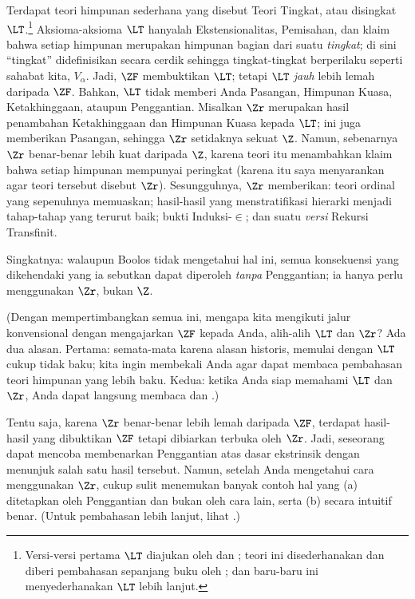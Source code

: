 \documentclass[../../../include/open-logic-section]{subfiles}
\begin{document}
Terdapat teori himpunan sederhana yang disebut Teori Tingkat, atau disingkat
$\LT$.\footnote{Versi-versi pertama $\LT$ diajukan oleh
\citet{Montague1965} dan \citet{Scott1974}; teori ini disederhanakan dan
diberi pembahasan sepanjang buku oleh \citet{Potter2004}; dan
\citet{ButtonLT1} baru-baru ini menyederhanakan $\LT$ lebih lanjut.}
Aksioma-aksioma $\LT$ hanyalah Ekstensionalitas, Pemisahan, dan klaim bahwa
setiap himpunan merupakan himpunan bagian dari suatu \emph{tingkat}; di sini
``tingkat'' didefinisikan secara cerdik sehingga tingkat-tingkat berperilaku
seperti sahabat kita, $V_\alpha$. Jadi, $\ZF$ membuktikan $\LT$; tetapi
$\LT$ \emph{jauh} lebih lemah daripada $\ZF$. Bahkan, $\LT$ tidak memberi
Anda Pasangan, Himpunan Kuasa, Ketakhinggaan, ataupun Penggantian. Misalkan
$\Zr$ merupakan hasil penambahan Ketakhinggaan dan Himpunan Kuasa kepada
$\LT$; ini juga memberikan Pasangan, sehingga $\Zr$ setidaknya sekuat $\Z$.
Namun, sebenarnya $\Zr$ benar-benar lebih kuat daripada $\Z$, karena teori
itu menambahkan klaim bahwa setiap himpunan mempunyai peringkat (karena itu
saya menyarankan agar teori tersebut disebut $\Zr$). Sesungguhnya, $\Zr$
memberikan: teori ordinal yang sepenuhnya memuaskan; hasil-hasil yang
menstratifikasi hierarki menjadi tahap-tahap yang terurut baik; bukti
Induksi-$\in$; dan suatu \emph{versi} Rekursi Transfinit.

Singkatnya: walaupun Boolos tidak mengetahui hal ini, semua konsekuensi yang
dikehendaki yang ia sebutkan dapat diperoleh \emph{tanpa} Penggantian; ia
hanya perlu menggunakan $\Zr$, bukan $\Z$.

(Dengan mempertimbangkan semua ini, mengapa kita mengikuti jalur
konvensional dengan mengajarkan $\ZF$ kepada Anda, alih-alih $\LT$ dan
$\Zr$? Ada dua alasan. Pertama: semata-mata karena alasan historis, memulai
dengan $\LT$ cukup tidak baku; kita ingin membekali Anda agar dapat membaca
pembahasan teori himpunan yang lebih baku. Kedua: ketika Anda siap memahami
$\LT$ dan $\Zr$, Anda dapat langsung membaca \citealt{Potter2004} dan
\citealt{ButtonLT1}.)

Tentu saja, karena $\Zr$ benar-benar lebih lemah daripada $\ZF$, terdapat
hasil-hasil yang dibuktikan $\ZF$ tetapi dibiarkan terbuka oleh $\Zr$. Jadi,
seseorang dapat mencoba membenarkan Penggantian atas dasar ekstrinsik dengan
menunjuk salah satu hasil tersebut. Namun, setelah Anda mengetahui cara
menggunakan $\Zr$, cukup sulit menemukan banyak contoh hal yang (a)
ditetapkan oleh Penggantian dan bukan oleh cara lain, serta (b) secara
intuitif benar. (Untuk pembahasan lebih lanjut, lihat
\citealt[\S13.2]{Potter2004}.)
\end{document}

